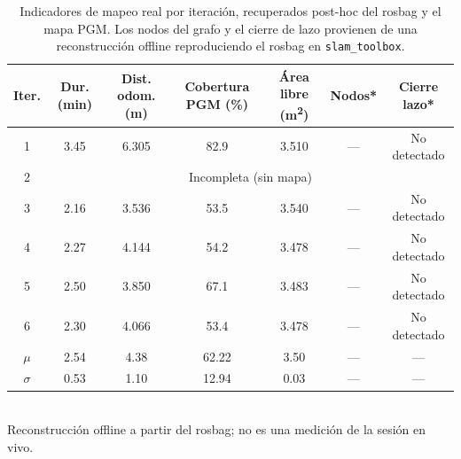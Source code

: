 \begin{table}[H]
\centering
\caption{Indicadores de mapeo real por iteración, recuperados post-hoc del rosbag y el mapa PGM. Los nodos del grafo y el cierre de lazo provienen de una reconstrucción offline reproduciendo el rosbag en \texttt{slam\_toolbox}.}
\label{tab:slam_real_por_iteracion}
\small
\begin{tabular}{c c c c c c c}
\toprule
\textbf{Iter.} & \textbf{Dur. (min)} & \textbf{Dist. odom. (m)} & \textbf{Cobertura PGM (\%)} & \textbf{Área libre (m\textsuperscript{2})} & \textbf{Nodos*} & \textbf{Cierre lazo*} \\
\midrule
1 & 3.45 & 6.305 & 82.9 & 3.510 & --- & No detectado \\
2 & \multicolumn{6}{c}{Incompleta (sin mapa)} \\
3 & 2.16 & 3.536 & 53.5 & 3.540 & --- & No detectado \\
4 & 2.27 & 4.144 & 54.2 & 3.478 & --- & No detectado \\
5 & 2.50 & 3.850 & 67.1 & 3.483 & --- & No detectado \\
6 & 2.30 & 4.066 & 53.4 & 3.478 & --- & No detectado \\
\midrule
$\mu$ & 2.54 & 4.38 & 62.22 & 3.50 & --- & --- \\
$\sigma$ & 0.53 & 1.10 & 12.94 & 0.03 & --- & --- \\
\bottomrule
\end{tabular}
\\[2pt] {\footnotesize * Reconstrucción offline a partir del rosbag; no es una medición de la sesión en vivo.}
\end{table}
